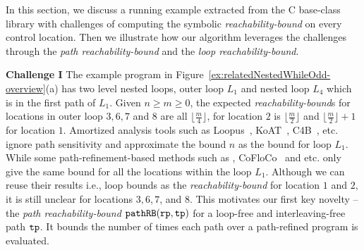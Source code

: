In this section, we discuss a running example extracted from the C base-class library with
challenges of computing the symbolic
\emph{reachability-bound} on
every control location. Then we illustrate how our algorithm leverages the challenges through the \emph{path reachability-bound} and the \emph{loop reachability-bound}.


\textbf{Challenge I}
The example program in Figure~\ref{ex:relatedNestedWhileOdd-overview}(a) has two level nested loops, outer loop $L_1$ and nested loop $L_4$ which is in the first path of $L_1$. Given $n \geq m \geq 0$,
the expected \emph{reachability-bound}s for locations in outer loop $3, 6, 7$ and $8$ are all $\lfloor\frac{m}{4}\rfloor$,
for location $2$ is $\lfloor\frac{m}{2}\rfloor$ and $\lfloor\frac{m}{2}\rfloor + 1$ for location $1$.
Amortized analysis tools such as Loopus~\cite{SinnZV17}, KoAT~\cite{BrockschmidtEFFG14,FalkeKS12,FalkeKS11}, C4B~\cite{CarbonneauxHS15}, etc. ignore path sensitivity and approximate the bound $n$ as the bound for loop $L_1$. 
While some path-refinement-based methods such as \cite{GulwaniZ10,GulwaniJK09}, CoFloCo~\cite{Montoya17,Flores-Montoya16,Flores-MontoyaH14} and etc. only give the same bound for all the locations within the loop $L_1$. 
Although we can reuse their results i.e., loop bounds as the \emph{reachability-bound} for location $1$ and $2$,
it is still unclear for locations $3, 6, 7$, and $8$.
%
This motivates our first key novelty -- the \emph{path reachability-bound} $\mathtt{pathRB}(\mathtt{rp}, \mathtt{tp})$ for a loop-free and interleaving-free path $\mathtt{tp}$.
It bounds the number of times each path over a path-refined program is evaluated.


